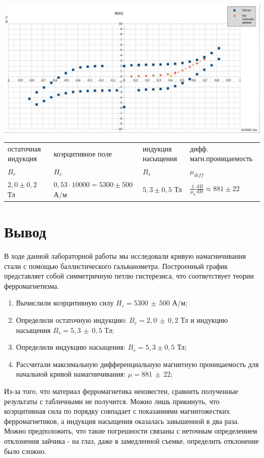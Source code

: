 \documentclass[11pt]{article}
\begin{document}
\includegraphics[width = 18cm]{g6}\\
\begin{tabular}{|l|l|l|l|}
\hline
остаточная индукция & коэрцитивное поле & индукция насыщения & дифф. магн.проницаемость\\
$B_r$ & $H_c$ & $B_s$ & $\mu_{diff}$\\
\hline
$2,0 \pm 0,2$ Тл & $0,53\cdot10000 = 5300 \pm 500$ А/м & $5,3 \pm 0,5$ Тл & $\frac{1}{\mu_{0}}\frac{dB}{dH} \approx 881 \pm 22$ \\
\hline
\end{tabular}
\section{Вывод}
В ходе данной лабораторной работы мы исследовали кривую намагничивания стали с помощью баллистического гальванометра.  Построенный график представляет собой симметричную петлю гистерезиса, что соответствует теории ферромагнетизма.\\
\begin{enumerate}
		\item 
			Вычислили коэрцитивную силу $H_c = 5300\,\pm\, 500$ А/м;
		\item 
			Определили остаточную индукцию: $B_r =2,0\,\pm\,0,2$ Тл и индукцию насыщения $B_s = 5,3\,\pm\, 0,5$ Тл;
		\item
		Определили индукцию насыщения: $B_s = 5,3 \pm 0,5$ Тл;
		\item
			Рассчитали максимальную дифференциальную магнитную проницаемость для начальной кривой намагничивания: $\mu = 881 \, \pm \, 22$;
	\end{enumerate}
Из-за того, что материал ферромагнетика неизвестен, сравнить полученные результаты с табличными не получится. Можно лишь прикинуть, что коэрцитивная сила по порядку совпадает с показаниями магнитожестких ферромагнетиков, а индукция насыщения оказалась завышенной в два раза. Можно предположить, что такие погрешности связаны с неточным определением отклонения зайчика - на глаз, даже в замедленной съемке, определить отклонение было сложно.\\
\end{document}
